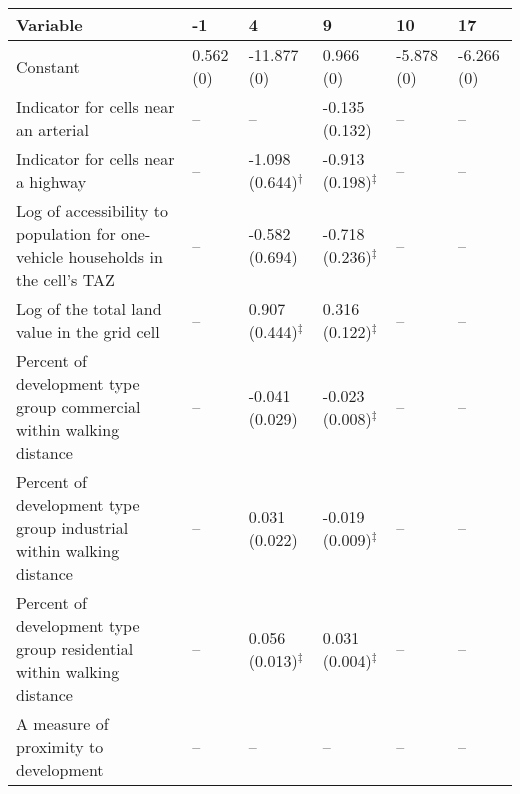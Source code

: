 
\begin{tabular}{p{3in}p{0.5in}p{0.5in}p{0.5in}p{0.5in}p{0.5in}}
\hline\hline
Variable & -1 & 4 & 9 & 10 & 17 \\\hline
Constant & 0.562 (0) & -11.877 (0) & 0.966 (0) & -5.878 (0) & -6.266 (0) \\
Indicator for cells near an arterial & -- & -- & -0.135 (0.132) & -- & -- \\
Indicator for cells near a highway & -- & -1.098 (0.644)$^{\dagger}$ & -0.913 (0.198)$^{\ddagger}$ & -- & -- \\
Log of accessibility to population for one-vehicle households in the cell's TAZ & -- & -0.582 (0.694) & -0.718 (0.236)$^{\ddagger}$ & -- & -- \\
Log of the total land value in the grid cell & -- & 0.907 (0.444)$^{\ddagger}$ & 0.316 (0.122)$^{\ddagger}$ & -- & -- \\
Percent of development type group commercial within walking distance & -- & -0.041 (0.029) & -0.023 (0.008)$^{\ddagger}$ & -- & -- \\
Percent of development type group industrial within walking distance & -- & 0.031 (0.022) & -0.019 (0.009)$^{\ddagger}$ & -- & -- \\
Percent of development type group residential within walking distance & -- & 0.056 (0.013)$^{\ddagger}$ & 0.031 (0.004)$^{\ddagger}$ & -- & -- \\
A measure of proximity to development & -- & -- & -- & -- & -- \\
\hline\hline
\end{tabular}
